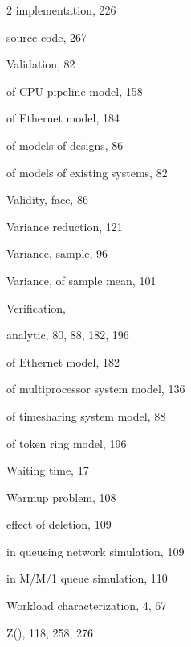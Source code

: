 \begin{multicols}{2}
\quad implementation, 226\par
\quad source code, 267\par
\noindent Validation, 82\par
\quad of CPU pipeline model, 158\par
\quad of Ethernet model, 184\par
\quad of models of designs, 86\par
\quad of models of existing systems, 82\par
\noindent Validity, face, 86\par
\noindent Variance reduction, 121\par
\noindent Variance, sample, 96\par
\noindent Variance, of sample mean, 101\par
\noindent Verification,\par
\quad analytic, 80, 88, 182, 196\par
\columnbreak
\quad of Ethernet model, 182\par
\quad of multiprocessor system model, 136\par
\quad of timesharing system model, 88\par
\quad of token ring model, 196\par
\noindent Waiting time, 17\par
\noindent Warmup problem, 108\par
\quad effect of deletion, 109\par
\quad in queueing network simulation, 109\par
\quad in M/M/1 queue simulation, 110\par
\noindent Workload characterization, 4, 67\par
\noindent Z(), 118, 258, 276\par
\end{multicols}
\endgroup
